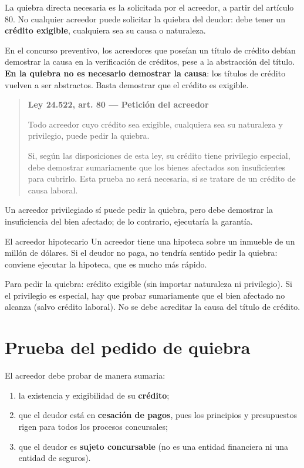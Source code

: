 \documentclass[12pt,oneside]{book}
\newenvironment{articulo}[1]
  {\begin{quote}\small\textbf{#1}\par\smallskip}
  {\end{quote}}
\begin{document}
La quiebra directa necesaria es la solicitada por el acreedor, a partir del artículo 80. No cualquier acreedor puede solicitar la quiebra del deudor: debe tener un \textbf{crédito exigible}, cualquiera sea su causa o naturaleza.

En el concurso preventivo, los acreedores que poseían un título de crédito debían demostrar la causa en la verificación de créditos, pese a la abstracción del título. \textbf{En la quiebra no es necesario demostrar la causa}: los títulos de crédito vuelven a ser abstractos. Basta demostrar que el crédito es exigible.

\begin{articulo}{Ley 24.522, art. 80 --- Petición del acreedor}
Todo acreedor cuyo crédito sea exigible, cualquiera sea su naturaleza y privilegio, puede pedir la quiebra.

Si, según las disposiciones de esta ley, su crédito tiene privilegio especial, debe demostrar sumariamente que los bienes afectados son insuficientes para cubrirlo. Esta prueba no será necesaria, si se tratare de un crédito de causa laboral.
\end{articulo}

Un acreedor privilegiado sí puede pedir la quiebra, pero debe demostrar la insuficiencia del bien afectado; de lo contrario, ejecutaría la garantía.

\begin{example}{El acreedor hipotecario}
Un acreedor tiene una hipoteca sobre un inmueble de un millón de dólares. Si el deudor no paga, no tendría sentido pedir la quiebra: conviene ejecutar la hipoteca, que es mucho más rápido.
\end{example}

\begin{important}
Para pedir la quiebra: crédito exigible (sin importar naturaleza ni privilegio). Si el privilegio es especial, hay que probar sumariamente que el bien afectado no alcanza (salvo crédito laboral). No se debe acreditar la causa del título de crédito.
\end{important}

\section{Prueba del pedido de quiebra}

El acreedor debe probar de manera sumaria:
\begin{enumerate}
    \item la existencia y exigibilidad de su \textbf{crédito};
    \item que el deudor está en \textbf{cesación de pagos}, pues los principios y presupuestos rigen para todos los procesos concursales;
    \item que el deudor es \textbf{sujeto concursable} (no es una entidad financiera ni una entidad de seguros).
\end{enumerate}
\end{document}
